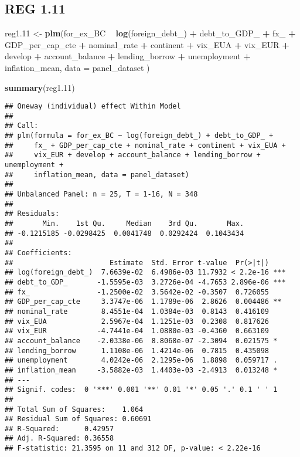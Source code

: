 \documentclass[]{article}
\newenvironment{Shaded}{\begin{snugshade}}{\end{snugshade}}
\newcommand{\KeywordTok}[1]{\textcolor[rgb]{0.13,0.29,0.53}{\textbf{#1}}}
\newcommand{\DataTypeTok}[1]{\textcolor[rgb]{0.13,0.29,0.53}{#1}}
\newcommand{\DecValTok}[1]{\textcolor[rgb]{0.00,0.00,0.81}{#1}}
\newcommand{\StringTok}[1]{\textcolor[rgb]{0.31,0.60,0.02}{#1}}
\newcommand{\OperatorTok}[1]{\textcolor[rgb]{0.81,0.36,0.00}{\textbf{#1}}}
\newcommand{\NormalTok}[1]{#1}
\begin{document}
\subsection{REG 1.11}\label{reg-1.11}

\begin{Shaded}
\begin{Highlighting}[]
\NormalTok{reg1.}\DecValTok{11}\NormalTok{ <-}\StringTok{ }\KeywordTok{plm}\NormalTok{(for_ex_BC }\OperatorTok{~}\StringTok{  }\KeywordTok{log}\NormalTok{(foreign_debt_) }\OperatorTok{+}\StringTok{ }\NormalTok{debt_to_GDP_ }\OperatorTok{+}\StringTok{ }\NormalTok{fx_ }\OperatorTok{+}\StringTok{ }\NormalTok{GDP_per_cap_cte }\OperatorTok{+}\StringTok{ }\NormalTok{nominal_rate }\OperatorTok{+}\StringTok{ }\NormalTok{continent }\OperatorTok{+}\StringTok{ }\NormalTok{vix_EUA }\OperatorTok{+}\StringTok{ }\NormalTok{vix_EUR }\OperatorTok{+}\StringTok{ }\NormalTok{develop }\OperatorTok{+}\StringTok{ }\NormalTok{account_balance }\OperatorTok{+}\StringTok{ }\NormalTok{lending_borrow }\OperatorTok{+}\StringTok{ }\NormalTok{unemployment }\OperatorTok{+}\StringTok{ }\NormalTok{inflation_mean, }\DataTypeTok{data =}\NormalTok{ panel_dataset )}

\KeywordTok{summary}\NormalTok{(reg1.}\DecValTok{11}\NormalTok{)}
\end{Highlighting}
\end{Shaded}

\begin{verbatim}
## Oneway (individual) effect Within Model
## 
## Call:
## plm(formula = for_ex_BC ~ log(foreign_debt_) + debt_to_GDP_ + 
##     fx_ + GDP_per_cap_cte + nominal_rate + continent + vix_EUA + 
##     vix_EUR + develop + account_balance + lending_borrow + unemployment + 
##     inflation_mean, data = panel_dataset)
## 
## Unbalanced Panel: n = 25, T = 1-16, N = 348
## 
## Residuals:
##       Min.    1st Qu.     Median    3rd Qu.       Max. 
## -0.1215185 -0.0298425  0.0041748  0.0292424  0.1043434 
## 
## Coefficients:
##                       Estimate  Std. Error t-value  Pr(>|t|)    
## log(foreign_debt_)  7.6639e-02  6.4986e-03 11.7932 < 2.2e-16 ***
## debt_to_GDP_       -1.5595e-03  3.2726e-04 -4.7653 2.896e-06 ***
## fx_                -1.2500e-02  3.5642e-02 -0.3507  0.726055    
## GDP_per_cap_cte     3.3747e-06  1.1789e-06  2.8626  0.004486 ** 
## nominal_rate        8.4551e-04  1.0384e-03  0.8143  0.416109    
## vix_EUA             2.5967e-04  1.1251e-03  0.2308  0.817626    
## vix_EUR            -4.7441e-04  1.0880e-03 -0.4360  0.663109    
## account_balance    -2.0338e-06  8.8068e-07 -2.3094  0.021575 *  
## lending_borrow      1.1108e-06  1.4214e-06  0.7815  0.435098    
## unemployment        4.0242e-06  2.1295e-06  1.8898  0.059717 .  
## inflation_mean     -3.5882e-03  1.4403e-03 -2.4913  0.013248 *  
## ---
## Signif. codes:  0 '***' 0.001 '**' 0.01 '*' 0.05 '.' 0.1 ' ' 1
## 
## Total Sum of Squares:    1.064
## Residual Sum of Squares: 0.60691
## R-Squared:      0.42957
## Adj. R-Squared: 0.36558
## F-statistic: 21.3595 on 11 and 312 DF, p-value: < 2.22e-16
\end{verbatim}
\end{document}
